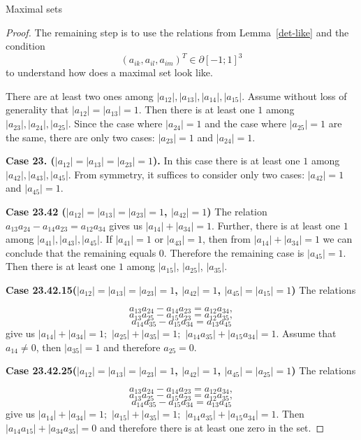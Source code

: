 \documentclass[12pt]{article}
\begin{document}
\begin{section}{Maximal sets}
\begin{proof}
        The remaining step is to use the relations from Lemma~\ref{det-like} and the condition $$(a_{ik}, a_{il},a_{im})^{T} \in \partial [-1;1]^{3}$$ to understand how does a maximal set look like.
    
        There are at least two ones among $|a_{12}|,|a_{13}|,|a_{14}|,|a_{15}|$. Assume without loss of generality that  $|a_{12}|=|a_{13}|=1.$ Then there is at least one $1$ among $|a_{23}|, |a_{24}|,|a_{25}|$. Since the case where $|a_{24}|=1$ and the case where $|a_{25}|=1$ are the same, there are only two cases: $|a_{23}|=1$ and $|a_{24}|=1.$
    
        \textbf{Case 23. ($|a_{12}|=|a_{13}|=|a_{23}|=1$).} In this case there is at least one $1$ among $|a_{42}|, |a_{43}|,|a_{45}|$. From symmetry, it suffices to consider only two cases: $|a_{42}|=1$ and $|a_{45}|=1.$
    
        \textbf{Case 23.42 ($|a_{12}|=|a_{13}|=|a_{23}|=1$, $|a_{42}|=1$)} The relation  $a_{13}a_{24} - a_{14}a_{23} = a_{12}a_{34}$  gives us  $|a_{14}| + |a_{34}|=1.$ Further, there is at least one $1$ among $|a_{41}|,|a_{43}|, |a_{45}|$. If $|a_{41}|=1$ or $|a_{43}|=1$, then from $|a_{14}| + |a_{34}|=1$ we can conclude that the remaining equals $0$. Therefore the remaining case is $|a_{45}|=1.$ Then there is at least one $1$ among $|a_{15}|$, $|a_{25}|$, $|a_{35}|$.
    
         \textbf{Case 23.42.15($|a_{12}|=|a_{13}|=|a_{23}|=1$, $|a_{42}|=1$, $|a_{45}|=|a_{15}|=1$)} The relations 
         
         $$
            a_{13}a_{24} - a_{14}a_{23} = a_{12}a_{34},
         $$
           $$
            a_{13}a_{25} - a_{15}a_{23} = a_{12}a_{35},
         $$
         $$
            a_{14}a_{35} - a_{15}a_{34} = a_{13}a_{45}
         $$
         give us $|a_{14}| + |a_{34}| = 1;$ $|a_{25}| + |a_{35}| = 1;$ $|a_{14}a_{35}| + |a_{15}a_{34}| = 1$. Assume that $a_{14}\neq 0$, then $|a_{35}|=1$ and therefore $a_{25}=0.$
         
         
         \textbf{Case 23.42.25($|a_{12}|=|a_{13}|=|a_{23}|=1$, $|a_{42}|=1$, $|a_{45}|=|a_{25}|=1$)} The relations 
         
         $$
            a_{13}a_{24} - a_{14}a_{23} = a_{12}a_{34},
         $$
           $$
            a_{13}a_{25} - a_{15}a_{23} = a_{12}a_{35},
         $$
         $$
            a_{14}a_{35} - a_{15}a_{34} = a_{13}a_{45}
         $$
         give us $|a_{14}| + |a_{34}| = 1;$ $|a_{15}| + |a_{35}| = 1;$ $|a_{14}a_{35}| + |a_{15}a_{34}| = 1$. Then $|a_{14}a_{15}| + |a_{34}a_{35}|=0$ and therefore there is at least one zero in the set.
         

\end{proof}
\end{section}
\end{document}
